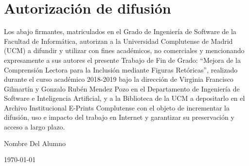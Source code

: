 \chapter*{Autorización de difusión}

   
Los abajo firmantes, matriculados en el Grado de Ingeniería de Software de la Facultad de Informática, autorizan a la Universidad Complutense de Madrid (UCM) a difundir y utilizar con fines académicos, no comerciales y mencionando expresamente a sus autores el presente Trabajo de Fin de Grado: ``Mejora de la Comprensión Lectora para la Inclusión mediante Figuras Retóricas'', realizado durante el curso académico 2018-2019 bajo la dirección de Virginia Francisco Gilmartín y Gonzalo Rubén Mendez Pozo en el Departamento de Ingeniería de Software e Inteligencia Artificial, y a la Biblioteca de la UCM a depositarlo en el Archivo Institucional E-Prints Complutense con el objeto de incrementar la difusión, uso e impacto del trabajo en Internet y garantizar su preservación y acceso a largo plazo.

\vspace{5cm}

\begin{center}
	\large Nombre Del Alumno\\
	
	\vspace{0.5cm}
	
	
	\today\\
	
\end{center}
